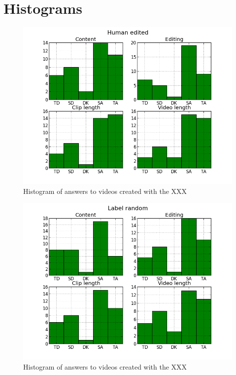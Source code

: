 %
\section{Histograms}\label{app:histograms}
%
\begin{figure}
     \centering
     \includegraphics[width=1.0\textwidth]{img/humanedited_barplot.png}
     \caption{Histogram of answers to videos created with the XXX}\label{fig:hist_human}
\end{figure}
%
\begin{figure}
     \centering
     \includegraphics[width=1.0\textwidth]{img/labelrandom_barplot.png}
     \caption{Histogram of answers to videos created with the XXX}\label{fig:hist_labelrandom}
\end{figure}
